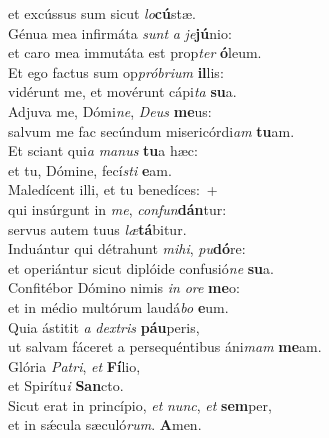\evenverse et excússus sum sicut \textit{lo}\textbf{cú}stæ.\\
\oddverse Génua mea infirmáta \textit{sunt} \textit{a} \textit{je}\textbf{jú}nio:~\*\\
\oddverse et caro mea immutáta est prop\textit{ter} \textbf{ó}leum.\\
\evenverse Et ego factus sum op\textit{pró}\textit{bri}\textit{um} \textbf{il}lis:~\*\\
\evenverse vidérunt me, et movérunt cápi\textit{ta} \textbf{su}a.\\
\oddverse Adjuva me, Dómi\textit{ne}, \textit{De}\textit{us} \textbf{me}us:~\*\\
\oddverse salvum me fac secúndum misericórdi\textit{am} \textbf{tu}am.\\
\evenverse Et sciant qui\textit{a} \textit{ma}\textit{nus} \textbf{tu}a hæc:~\*\\
\evenverse et tu, Dómine, fecí\textit{sti} \textbf{e}am.\\
\oddverse Maledícent illi, et tu benedíces:~+\\
\oddverse  qui insúrgunt in \textit{me}, \textit{con}\textit{fun}\textbf{dán}tur:~\*\\
\oddverse servus autem tuus \textit{læ}\textbf{tá}bitur.\\
\evenverse Induántur qui détrahunt \textit{mi}\textit{hi}, \textit{pu}\textbf{dó}re:~\*\\
\evenverse et operiántur sicut diplóide confusió\textit{ne} \textbf{su}a.\\
\oddverse Confitébor Dómino nimis \textit{in} \textit{o}\textit{re} \textbf{me}o:~\*\\
\oddverse et in médio multórum laudá\textit{bo} \textbf{e}um.\\
\evenverse Quia ástitit \textit{a} \textit{dex}\textit{tris} \textbf{páu}peris,~\*\\
\evenverse ut salvam fáceret a persequéntibus áni\textit{mam} \textbf{me}am.\\
\oddverse Glória \textit{Pa}\textit{tri}, \textit{et} \textbf{Fí}lio,~\*\\
\oddverse et Spirítu\textit{i} \textbf{San}cto.\\
\evenverse Sicut erat in princípio, \textit{et} \textit{nunc}, \textit{et} \textbf{sem}per,~\*\\
\evenverse et in sǽcula sæculó\textit{rum}. \textbf{A}men.\\
